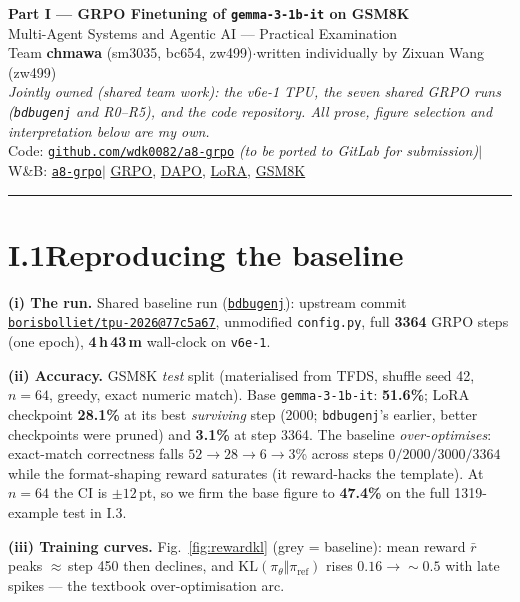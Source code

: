 \documentclass[11pt]{article}
\newcommand{\wb}[1]{\href{https://wandb.ai/sichengma0514-university-of-cambridge/a8-grpo/runs/#1}{\texttt{#1}}}
\newcommand{\axv}[2]{\href{https://arxiv.org/abs/#1}{#2}}
\newcommand{\code}[1]{\texttt{#1}}
\begin{document}
\begin{center}
  {\Large\bfseries Part I --- GRPO Finetuning of \texttt{gemma-3-1b-it} on GSM8K}\\[3pt]
  {Multi-Agent Systems and Agentic AI --- Practical Examination}\\[5pt]
  {\small Team \textbf{chmawa} (sm3035, bc654, zw499)\quad$\cdot$\quad written individually by Zixuan Wang (zw499)}\\[3pt]
  {\small\itshape Jointly owned (shared team work): the v6e-1 TPU, the seven shared GRPO runs (\texttt{bdbugenj} and R0--R5), and the code repository.
  All prose, figure selection and interpretation below are my own.}\\[3pt]
  {\small Code: \href{https://github.com/wdk0082/a8-grpo}{\texttt{github.com/wdk0082/a8-grpo}} \emph{(to be ported to GitLab for submission)}\;$\mid$\;
  W\&B: \href{https://wandb.ai/sichengma0514-university-of-cambridge/a8-grpo}{\texttt{a8-grpo}}\;$\mid$\;
  \axv{2402.03300}{GRPO}, \axv{2503.14476}{DAPO}, \axv{2106.09685}{LoRA}, \href{https://huggingface.co/datasets/openai/gsm8k}{GSM8K}}
\end{center}
\vspace{1pt}\hrule\vspace{4pt}

\section*{I.1\quad Reproducing the baseline}
\textbf{(i) The run.} Shared baseline run (\wb{bdbugenj}): upstream commit
\href{https://github.com/borisbolliet/tpu-2026}{\texttt{borisbolliet/tpu-2026@77c5a67}}, unmodified \code{config.py},
full \textbf{3364} GRPO steps (one epoch), \textbf{4\,h\,43\,m} wall-clock on \code{v6e-1}.

\textbf{(ii) Accuracy.} GSM8K \emph{test} split (materialised from TFDS, shuffle seed 42, $n{=}64$, greedy, exact numeric match).
Base \code{gemma-3-1b-it}: \textbf{51.6\%}; LoRA checkpoint \textbf{28.1\%} at its best \emph{surviving} step (2000; \code{bdbugenj}'s earlier, better checkpoints were pruned) and \textbf{3.1\%} at step 3364.
The baseline \emph{over-optimises}: exact-match correctness falls $52\!\to\!28\!\to\!6\!\to\!3$\% across steps $0/2000/3000/3364$ while the
format-shaping reward saturates (it reward-hacks the template). At $n{=}64$ the CI is $\pm12$\,pt, so we firm the base figure to
\textbf{47.4\%} on the full 1319-example test in I.3.

\textbf{(iii) Training curves.} Fig.~\ref{fig:rewardkl} (grey = baseline): mean reward $\bar r$ peaks $\approx$\,step 450 then declines, and
$\mathrm{KL}(\pi_\theta\Vert\pi_{\mathrm{ref}})$ rises $0.16\!\to\!{\sim}0.5$ with late spikes --- the textbook over-optimisation arc.
\end{document}
